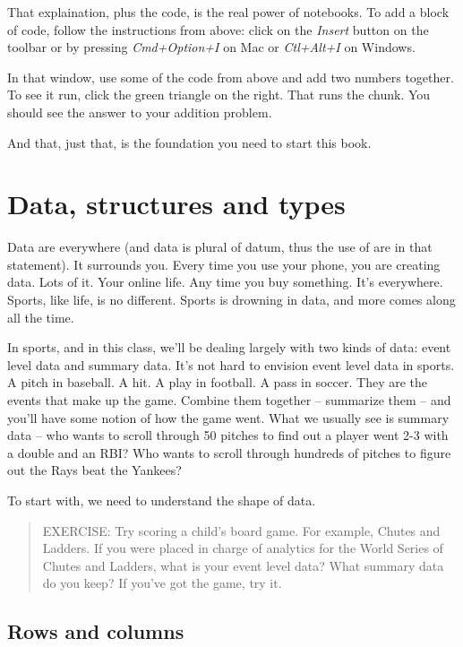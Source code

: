 \documentclass[
]{book}
\begin{document}
That explaination, plus the code, is the real power of notebooks. To add a block of code, follow the instructions from above: click on the \emph{Insert} button on the toolbar or by pressing \emph{Cmd+Option+I} on Mac or \emph{Ctl+Alt+I} on Windows.

In that window, use some of the code from above and add two numbers together. To see it run, click the green triangle on the right. That runs the chunk. You should see the answer to your addition problem.

And that, just that, is the foundation you need to start this book.

\hypertarget{data-structures-and-types}{%
\chapter{Data, structures and types}\label{data-structures-and-types}}

Data are everywhere (and data is plural of datum, thus the use of are in that statement). It surrounds you. Every time you use your phone, you are creating data. Lots of it. Your online life. Any time you buy something. It's everywhere. Sports, like life, is no different. Sports is drowning in data, and more comes along all the time.

In sports, and in this class, we'll be dealing largely with two kinds of data: event level data and summary data. It's not hard to envision event level data in sports. A pitch in baseball. A hit. A play in football. A pass in soccer. They are the events that make up the game. Combine them together -- summarize them -- and you'll have some notion of how the game went. What we usually see is summary data -- who wants to scroll through 50 pitches to find out a player went 2-3 with a double and an RBI? Who wants to scroll through hundreds of pitches to figure out the Rays beat the Yankees?

To start with, we need to understand the shape of data.

\begin{quote}
EXERCISE: Try scoring a child's board game. For example, Chutes and Ladders. If you were placed in charge of analytics for the World Series of Chutes and Ladders, what is your event level data? What summary data do you keep? If you've got the game, try it.
\end{quote}

\hypertarget{rows-and-columns}{%
\section{Rows and columns}\label{rows-and-columns}}
\end{document}
